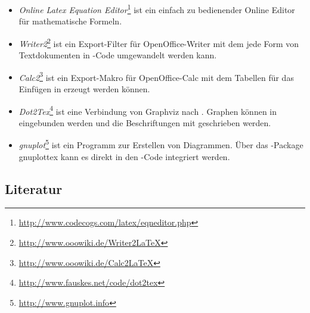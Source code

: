 \begin{itemize}
\item \emph{Online Latex Equation
Editor}\footnote{\url{http://www.codecogs.com/latex/eqneditor.php}} ist ein
einfach zu bedienender Online Editor für mathematische Formeln.
\item \emph{Writer2\latex}\footnote{\url{http://www.ooowiki.de/Writer2LaTeX}}
ist ein Export-Filter für OpenOffice-Writer mit dem jede Form von Textdokumenten in
\latex-Code umgewandelt werden kann.
\item \emph{Calc2\latex}\footnote{\url{http://www.ooowiki.de/Calc2LaTeX}} ist
ein Export-Makro für OpenOffice-Calc mit dem Tabellen für das Einfügen in \latex
erzeugt werden können.
\item \emph{Dot2Tex}\footnote{\url{http://www.fauskes.net/code/dot2tex}} ist
eine Verbindung von Graphviz nach \latex. Graphen können in \latex eingebunden werden
und die Beschriftungen mit \latex geschrieben werden.
\item \emph{gnuplot}\footnote{\url{http://www.gnuplot.info}} ist ein Programm
zur Erstellen von Diagrammen. Über das \latex-Package gnuplottex kann es direkt in
den \latex-Code integriert werden.
\end{itemize}


\subsection{Literatur}
\label{sec:literatur}

